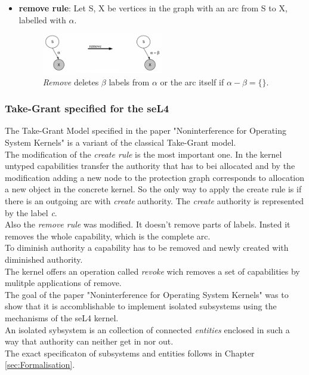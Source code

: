 \documentclass[pdftex,11pt,a4paper]{article}
\begin{document}
\begin{itemize}
	
	\item \textbf{remove rule}: Let S, X be vertices in the graph with an arc from S to X, labelled with $\alpha$. 
	\begin{figure}[ht]
	\centering
		\includegraphics[width=0.5\textwidth]{./Pictures/removeRule.png}
	\caption[remove rule]{\textit{Remove} deletes $\beta$ labels from $\alpha$ or the arc itself if $\alpha - \beta = \lbrace\rbrace$. \cite{TakeG}}
	\label{fig:clremove}
	\end{figure}		
	
	\end{itemize}
	
	
	\subsubsection{Take-Grant specified for the seL4}
	The Take-Grant Model specified in the paper "Noninterference for Operating System Kernels" \cite{TakeG} is a variant of the classical Take-Grant model. \\
	The modification of the \textit{create rule} is the most important one. In the kernel untyped capabilities transfer the authority that has to bei allocated and by the modification adding a new node to the protection graph corresponds to allocation a new object in the concrete kernel. So the only way to apply the create rule is if there is an outgoing arc with \textit{create} authority. The \textit{create} authority is represented by the label \textit{c}. \\
	Also the \textit{remove rule} was modified. It doesn't remove parts of labels. Insted it removes the whole capability, which is the complete arc.\\
	To diminish authority a capability has to be removed and newly created with diminished authority. \\
	The kernel offers an operation called \textit{revoke} wich removes a set of capabilities by mulitple applications of remove. \\
	The goal of the paper "Noninterference for Operating System Kernels" was to show that it is accomblishable to implement isolated subsystems using the mechanisms of the seL4 kernel. \cite{TakeG} \\
	An isolated sybsystem is an collection of connected \textit{entities} enclosed in such a way that authority can neither get in nor out. \\
	The exact specificaton of subsystems and entities follows in Chapter \ref{sec:Formalisation}.
	
\end{document}
